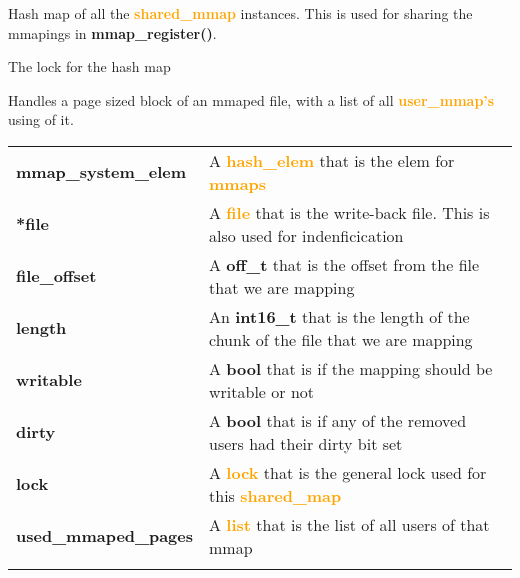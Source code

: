 \documentclass{report}
\newcommand{\fun}[1]{\textcolor{Emerald}{\textbf{#1}}}
\newcommand{\file}[1]{\textcolor{YellowGreen}{\textbf{#1}}}
\newcommand{\struct}[1]{\textcolor{orange}{\textbf{#1}}}
\newcommand{\var}[1]{\textcolor{RoyalPurple}{\textbf{#1}}}
\newcommand{\const}[1]{\textcolor{BrickRed}{\textbf{#1}}}
\newcommand{\pintoscode}[4]{}
\newcommand{\pintosfile}[3]{\pintoscode{#1}{#2}{\file{#3}}{#3}}
\begin{document}
				\pintosfile{37}{37}{mmap.c}
				Hash map of all the \struct{shared\_mmap} instances. This is used for 
				sharing the mmapings in \fun{mmap\_register()}.

				\pintosfile{40}{40}{mmap.c} 
				The lock for the hash map
				
				\pintosfile{45}{57}{mmap.c}
				Handles a page sized block of an mmaped file, with a list of all 
				\struct{user\_mmap's} using of it. \\
				\begin{center}
					\begin{tabular}{l p{10cm}}
							\vspace*{2mm}
							\var{mmap\_system\_elem}  & A \struct{hash\_elem} that is the elem for \struct{mmaps} \\ \vspace*{2mm}
							\var{*file}               & A \struct{file} that is the write-back file. This is also used for indenficication \\ \vspace*{2mm}
							\var{file\_offset}        & A \const{off\_t} that is the offset from the file that we are mapping \\ \vspace*{2mm}
							\var{length}              & An \const{int16\_t} that is the length of the chunk of the file that we are mapping \\ \vspace*{2mm}
							\var{writable}            & A \const{bool} that is if the mapping should be writable or not \\ \vspace*{2mm}
							\var{dirty}               & A \const{bool} that is if any of the removed users had their dirty bit set \\ \vspace*{2mm}
							\var{lock}                & A \struct{lock} that is the general lock used for this \struct{shared\_map}\\ \vspace*{2mm}
							\var{used\_mmaped\_pages} & A \struct{list} that is the list of all users of that mmap \\ \vspace*{2mm}
					\end{tabular}
				\end{center}
				
\end{document}
